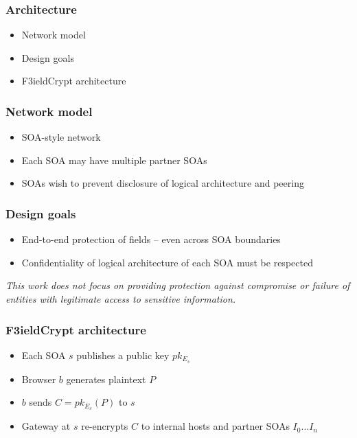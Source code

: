 \documentclass{beamer}
\begin{document}
\begin{frame}
\frametitle{Architecture}
\begin{itemize}
\item Network model
\item Design goals
\item F3ieldCrypt architecture
\end{itemize}
\end{frame}

\begin{frame}
\frametitle{Network model}
\begin{itemize}
\item SOA-style network
\item Each SOA may have multiple partner SOAs
\item SOAs wish to prevent disclosure of logical architecture and peering 
\end{itemize}
\end{frame}


\begin{frame}
\frametitle{Design goals}
\begin{itemize}
\item End-to-end protection of fields -- even across SOA boundaries
\item Confidentiality of logical architecture of each SOA must be respected
\end{itemize}
\medskip
\small{\emph{This work does not focus on providing protection against
compromise or failure of entities with legitimate access to sensitive
information.}}
\end{frame}

\begin{frame}
\frametitle{F3ieldCrypt architecture}
\begin{itemize}
\item Each SOA $s$ publishes a public key $pk_{E_s}$
\item Browser $b$ generates plaintext $P$
\item $b$ sends $C = pk_{E_s}(P)$ to $s$
\item Gateway at $s$ re-encrypts $C$ to internal hosts and partner SOAs
$I_0...I_n$ 
\end{itemize}
\end{frame}
\end{document}
